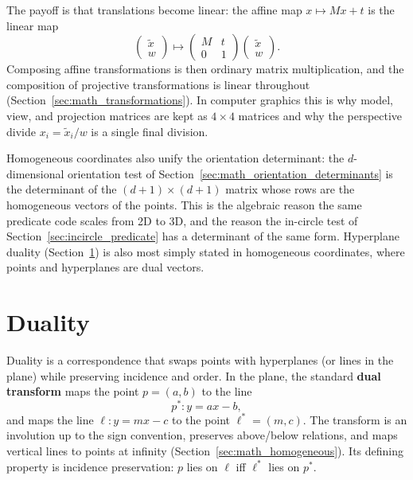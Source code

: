 The payoff is that translations become linear: the affine map
$x \mapsto Mx + t$ is the linear map
\[
  \begin{pmatrix} \tilde{x} \\ w \end{pmatrix}
  \mapsto
  \begin{pmatrix} M & t \\ 0 & 1 \end{pmatrix}
  \begin{pmatrix} \tilde{x} \\ w \end{pmatrix}.
\]
Composing affine transformations is then ordinary matrix multiplication, and
the composition of projective transformations is linear throughout
(Section~\ref{sec:math_transformations}). In computer graphics this is why
model, view, and projection matrices are kept as $4\times 4$ matrices and
why the perspective divide $x_i = \tilde{x}_i/w$ is a single final division.

Homogeneous coordinates also unify the orientation determinant: the
$d$-dimensional orientation test of Section~\ref{sec:math_orientation_determinants}
is the determinant of the $(d+1)\times(d+1)$ matrix whose rows are the
homogeneous vectors of the points. This is the algebraic reason the same
predicate code scales from 2D to 3D, and the reason the in-circle test of
Section~\ref{sec:incircle_predicate} has a determinant of the same form.
Hyperplane duality (Section~\ref{sec:math_duality}) is also most simply
stated in homogeneous coordinates, where points and hyperplanes are dual
vectors.


\section{Duality}
\label{sec:math_duality}

Duality is a correspondence that swaps points with hyperplanes (or lines in
the plane) while preserving incidence and order. In the plane, the standard
\textbf{dual transform} maps the point $p = (a,b)$ to the line
\[
  p^* : y = ax - b,
\]
and maps the line $\ell : y = mx - c$ to the point $\ell^* = (m,c)$. The
transform is an involution up to the sign convention, preserves
above/below relations, and maps vertical lines to points at infinity
(Section~\ref{sec:math_homogeneous}). Its defining property is incidence
preservation: $p$ lies on $\ell$ iff $\ell^*$ lies on $p^*$.

